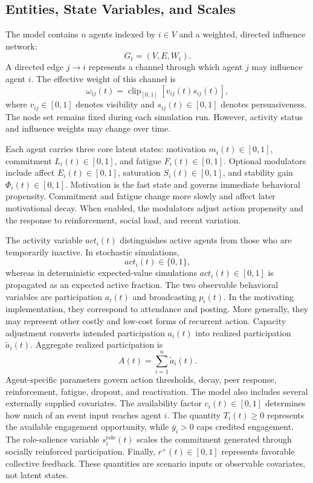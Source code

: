 \documentclass[11pt]{article}
\newcommand{\clip}{\operatorname{clip}_{[0,1]}}
\begin{document}
\subsection{Entities, State Variables, and Scales}
The model contains $n$ agents indexed by $i\in V$ and a weighted, directed influence network:
\[
G_t=(V,E,W_t).
\]
A directed edge $j \xrightarrow{} i$ represents a channel through which agent $j$ may influence agent $i$. The effective weight of this channel is
\[
\omega_{ij}(t)=\clip[v_{ij}(t)s_{ij}(t)],
\]
where $v_{ij}\in [0,1]$ denotes visibility and $s_{ij}(t)\in[0,1]$ denotes persuasiveness. The node set remains fixed during each simulation run. However, activity status and influence weights may change over time.

Each agent carries three core latent states: motivation $m_i(t)\in[0,1]$, commitment $L_i(t)\in [0,1]$, and fatigue $F_i(t)\in[0,1]$. Optional modulators include affect $E_i(t)\in[0,1]$, saturation $S_i(t)\in[0,1]$, and stability gain $\Phi_i(t)\in[0,1]$. Motivation is the fast state and governs immediate behavioral propensity. Commitment and fatigue change more slowly and affect later motivational decay. When enabled, the modulators adjust action propensity and the response to reinforcement, social load, and recent variation. 

The activity variable $act_i(t)$ distinguishes active agents from those who are temporarily inactive. In stochastic simulations,
\[
act_i(t)\in\{0,1\},
\]
whereas in deterministic expected-value simulations $act_i(t)\in[0,1]$ is propagated as an expected active fraction. The two observable behavioral variables are participation $a_i(t)$ and broadcasting $p_i(t)$. In the motivating implementation, they correspond to attendance and posting. More generally, they may represent other costly and low-cost forms of recurrent action. Capacity adjustment converts intended participation $a_i(t)$ into realized participation $\tilde{a}_i(t)$. Aggregate realized participation is
\[
A(t)=\sum_{i=1}^n\tilde{a}_i(t).
\]
Agent-specific parameters govern action thresholds, decay, peer response, reinforcement, fatigue, dropout, and reactivation. The model also includes several externally supplied covariates. The availability factor $c_i(t)\in[0,1]$ determines how much of an event input reaches agent $i$. The quantity $T_i(t)\ge0$ represents the available engagement opportunity, while $\bar{y}_i>0$ caps credited engagement. The role-salience variable $s_i^{\text{role}}(t)$ scales the commitment generated through socially reinforced participation. Finally, $r^+(t)\in[0,1]$ represents favorable collective feedback. These quantities are scenario inputs or observable covariates, not latent states.
\end{document}
